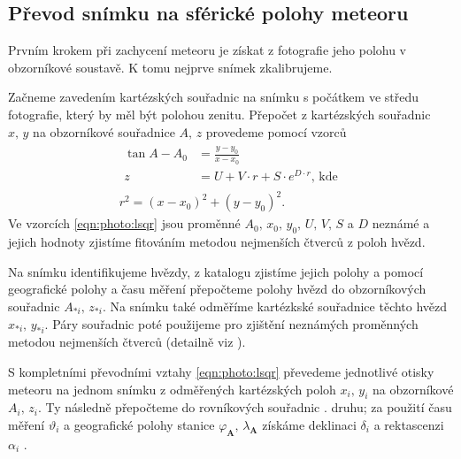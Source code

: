 \subsection{Převod snímku na sférické polohy meteoru}%
Prvním krokem při zachycení meteoru je získat z fotografie jeho polohu v obzorníkové soustavě. K tomu nejprve snímek zkalibrujeme.

Začneme zavedením kartézských souřadnic na snímku s počátkem ve středu fotografie, který by měl být polohou zenitu. Přepočet z kartézských souřadnic $x,\,y$ na obzorníkové souřadnice $A,\,z$ provedeme pomocí vzorců \cite{ceplecha}
\begin{eqnarray}
    \begin{aligned}
        \tan{A-A_0} & =\frac{y-y_0}{x-x_0}                        \\
        z           & =U+V\cdot r+S\cdot e^{D\cdot r}\text{, kde}
    \end{aligned}\label{eqn:photo:lsqr}\\
    r^2=(x-x_0)^2+(y-y_0)^2\text{.}
\end{eqnarray}
Ve vzorcích \eqref{eqn:photo:lsqr} jsou proměnné $A_0,\,x_0,\,y_0,\,U,\,V,\,S$ a $D$ neznámé a jejich hodnoty zjistíme fitováním metodou nejmenších čtverců z poloh hvězd.

Na snímku identifikujeme hvězdy, z katalogu zjistíme jejich polohy a pomocí geografické polohy a času měření přepočteme polohy hvězd do obzorníkových souřadnic $A_{\ast i},\,z_{\ast i}$. Na snímku také odměříme kartézkské souřadnice těchto hvězd $x_{\ast i},\,y_{\ast i}$. Páry souřadnic poté použijeme pro zjištění neznámých proměnných metodou nejmenších čtverců (detailně viz \cite[223--224]{ceplecha}).

S kompletními převodními vztahy \eqref{eqn:photo:lsqr} převedeme jednotlivé otisky meteoru na jednom snímku z odměřených kartézských poloh $x_i,\,y_i$ na obzorníkové $A_i,\,z_i$. Ty následně přepočteme do rovníkových souřadnic {\uppercase\expandafter{\relax}}. druhu; za použití času měření $\vartheta_i$ a geografické polohy stanice $\varphi_\mathbf{A},\,\lambda_\mathbf{A}$ získáme deklinaci $\delta_i$ a rektascenzi $\alpha_i$ \cite{ceplecha}.

